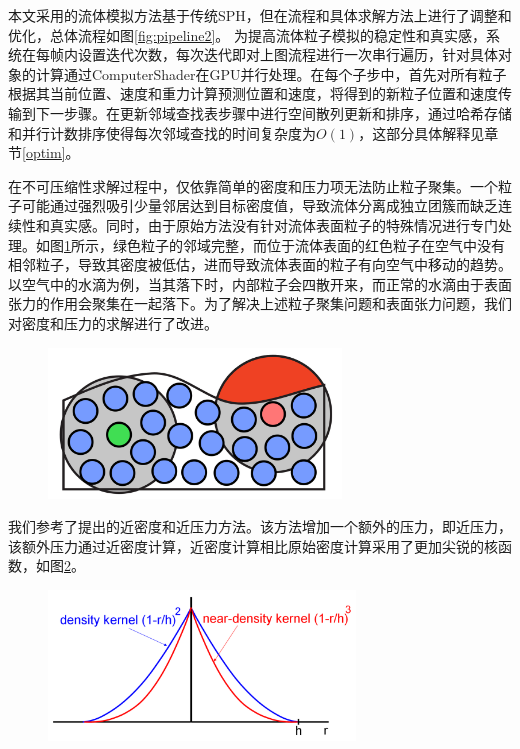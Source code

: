 本文采用的流体模拟方法基于传统SPH，但在流程和具体求解方法上进行了调整和优化，总体流程如图\ref{fig:pipeline2}。
为提高流体粒子模拟的稳定性和真实感，系统在每帧内设置迭代次数，每次迭代即对上图流程进行一次串行遍历，针对具体对象的计算通过ComputerShader在GPU并行处理。在每个子步中，首先对所有粒子根据其当前位置、速度和重力计算预测位置和速度，将得到的新粒子位置和速度传输到下一步骤。在更新邻域查找表步骤中进行空间散列更新和排序，通过哈希存储和并行计数排序使得每次邻域查找的时间复杂度为$O(1)$，这部分具体解释见章节\ref{optim}。

在不可压缩性求解过程中，仅依靠简单的密度和压力项无法防止粒子聚集。一个粒子可能通过强烈吸引少量邻居达到目标密度值，导致流体分离成独立团簇而缺乏连续性和真实感。同时，由于原始方法没有针对流体表面粒子的特殊情况进行专门处理。如图\ref{fig:surface}所示，绿色粒子的邻域完整，而位于流体表面的红色粒子在空气中没有相邻粒子，导致其密度被低估，进而导致流体表面的粒子有向空气中移动的趋势。以空气中的水滴为例，当其落下时，内部粒子会四散开来，而正常的水滴由于表面张力的作用会聚集在一起落下。为了解决上述粒子聚集问题和表面张力问题，我们对密度和压力的求解进行了改进。
\begin{figure}[h]
 \centering
 \includegraphics[height=4cm]{image/bounder.png}
 \label{fig:surface}
\end{figure}


我们参考了\cite{clavet2005particle}提出的近密度和近压力方法。该方法增加一个额外的压力，即近压力，该额外压力通过近密度计算，近密度计算相比原始密度计算采用了更加尖锐的核函数，如图\ref{fig:nearkernel}。
\begin{figure}[h]
 \centering
 \includegraphics[height=4cm]{image/nearkernel.png}
 \label{fig:nearkernel}
\end{figure}


